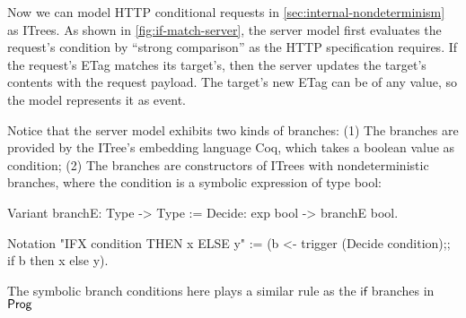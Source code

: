 Now we can model HTTP conditional requests in
\autoref{sec:internal-nondeterminism} as ITrees.  As shown in
\autoref{fig:if-match-server}, the server model first evaluates the request's
 condition by ``strong comparison'' as the HTTP specification
requires.  If the request's ETag matches its target's, then the server updates
the target's contents with the request payload.  The target's new ETag 
can be of any value, so the model represents it as  event.

Notice that the server model exhibits two kinds of branches: (1) The 
branches are provided by the ITree's embedding language Coq, which takes a
boolean value as condition; (2) The  branches are constructors of
ITrees with nondeterministic branches, where the condition is a symbolic
expression of type bool:
\begin{coq}
  Variant branchE: Type -> Type :=
    Decide: exp bool -> branchE bool.

  Notation "IFX condition THEN x ELSE y" :=
    (b <- trigger (Decide condition);;
     if b then x else y).
\end{coq}

The symbolic branch conditions here plays a similar rule as the $\mathsf{if}$
branches in $\mathsf{Prog}$
